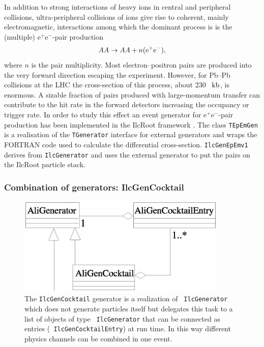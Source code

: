 \documentclass[12pt,a4paper,twoside]{article}
\begin{document}
In addition to strong interactions of heavy ions in central and
peripheral collisions, ultra-peripheral collisions of ions give
rise to coherent, mainly electromagnetic, interactions among which
the dominant process is is the (multiple) e$^+$e$^-$-pair
production \cite{MC:AlscherHT97}
\begin{equation}
  AA \to AA + n({\rm e}^+{\rm e}^-), \label{nee}
\end{equation}
where $n$ is the pair multiplicity. Most electron--positron pairs
are produced into the very forward direction escaping the
experiment. However, for  Pb--Pb collisions at the LHC the
cross-section of this process, about 230 \, ${\rm kb}$, is
enormous. A sizable fraction of pairs produced with large-momentum
transfer can contribute to the hit rate in the forward detectors
increasing the occupancy or trigger rate. In order to study this
effect an event generator for   e$^+$e$^-$-pair production has
been implemented in the IlcRoot framework \cite{MC:Sadovsky}. The
class \texttt{TEpEmGen} is a realisation of the \texttt{TGenerator}
interface for external generators and wraps the FORTRAN code used
to calculate the differential cross-section. \texttt{IlcGenEpEmv1}
derives from \texttt{IlcGenerator} and uses the external generator to
put the pairs on the IlcRoot particle stack.


\subsubsection{Combination of generators: IlcGenCocktail}

\begin{figure}[ht]
  \centering
  \includegraphics[width=10cm]{picts/cocktail}
  \caption{The \texttt{IlcGenCocktail} generator is a realization of {\tt
      IlcGenerator} which does not generate particles itself but
    delegates this task to a list of objects of type {\tt
      IlcGenerator} that can be connected as entries ({\tt
      IlcGenCocktailEntry}) at run time. In this way different physics
    channels can be combined in one event.} \label{MC:cocktail}
\end{figure}
\end{document}
